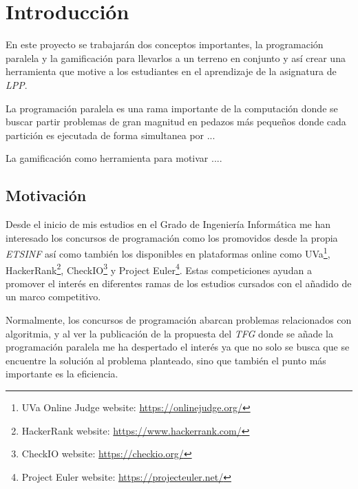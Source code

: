 \documentclass[11pt,spanish,listoffigures,listoftables]{tfgetsinf}
\begin{document}
\begin{abstract}[english]

... \par

... \par

... \par

\end{abstract}

\mainmatter

\chapter{Introducción}

En este proyecto se trabajarán dos conceptos importantes, la programación paralela y la gamificación para llevarlos a un terreno en conjunto y así crear una herramienta que motive a los estudiantes en el aprendizaje de la asignatura de \textit{LPP}.

La programación paralela es una rama importante de la computación donde se buscar partir problemas de gran magnitud en pedazos más pequeños donde cada partición es ejecutada de forma simultanea por ...

La gamificación como herramienta para motivar ....

\section{Motivación}

Desde el inicio de mis estudios en el Grado de Ingeniería Informática me han interesado los concursos de programación como los promovidos desde la propia \textit{ETSINF} así como también los disponibles en plataformas online como UVa\footnote{UVa Online Judge website: \url{https://onlinejudge.org/}}, HackerRank\footnote{HackerRank website: \url{https://www.hackerrank.com/}}, CheckIO\footnote{CheckIO website: \url{https://checkio.org/}} y Project Euler\footnote{Project Euler website: \url{https://projecteuler.net/}}. Estas competiciones ayudan a promover el interés en diferentes ramas de los estudios cursados con el añadido de un marco competitivo. \par

Normalmente, los concursos de programación abarcan problemas relacionados con algoritmia, y al ver la publicación de la propuesta del \textit{TFG} donde se añade la programación paralela me ha despertado el interés ya que no solo se busca que se encuentre la solución al problema planteado, sino que también el punto más importante es la eficiencia. \par
\end{document}
